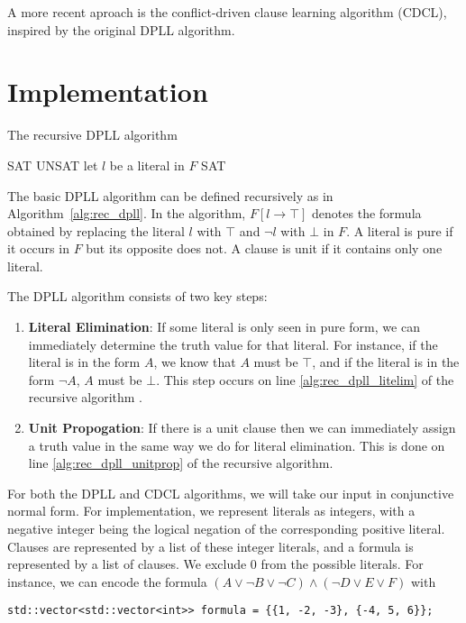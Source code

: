 \documentclass[10pt,AMS Euler]{article}
\begin{document}
A more recent aproach is the conflict-driven clause learning algorithm (CDCL), inspired by the original DPLL
algorithm. 

\section*{Implementation}
\label{sec:orgd4ad5e0}
\begin{algorithm}
\caption{The recursive DPLL algorithm}
\label{alg:rec_dpll}
\begin{algorithmic}[1]
  \State \Return SAT
  \State \Return UNSAT
 \label{alg:rec_dpll_litelim}
  \State \Return {}
 \label{alg:rec_dpll_unitprop}
  \State \Return {}
\Else
  \State let $l$ be a literal in $F$ \label{alg:rec_dpll_branch}
    \State \Return SAT
  \Else
    \State \Return {}
  \EndIf
\EndIf
\EndFunction
\end{algorithmic}
\end{algorithm}

The basic DPLL algorithm can be defined recursively as in Algorithm~\ref{alg:rec_dpll}.
In the algorithm, \(F[l \to \top]\) denotes the formula obtained by replacing the literal \(l\) with \(\top\) and
\(\neg l\) with \(\bot\) in \(F\). A literal is pure if it occurs in \(F\) but its opposite does not. A clause is unit
if it contains only one literal.

The DPLL algorithm consists of two key steps:
\begin{enumerate}
\item \textbf{Literal Elimination}: If some literal is only seen in pure form, we can immediately determine the
truth value for that literal. For instance, if the literal is in the form \(A\), we know that \(A\) must be
\(\top\), and if the literal is in the form \(\neg A\), \(A\) must be \(\bot\). This step occurs on line
\ref{alg:rec_dpll_litelim} of the recursive algorithm .
\item \textbf{Unit Propogation}: If there is a unit clause then we can immediately assign a truth value in the same
way we do for literal elimination. This is done on line \ref{alg:rec_dpll_unitprop} of the recursive
algorithm.
\end{enumerate}

For both the DPLL and CDCL algorithms, we will take our input in conjunctive normal form. For implementation,
we represent literals as integers, with a negative integer being the logical negation of the corresponding
positive literal. Clauses are represented by a list of these integer literals, and a formula is represented
by a list of clauses. We exclude 0 from the possible literals.
For instance, we can encode the formula \((A \lor \neg B \lor \neg C) \land (\neg D \lor E \lor F)\) with
\begin{verbatim}
std::vector<std::vector<int>> formula = {{1, -2, -3}, {-4, 5, 6}};
\end{verbatim}
\end{document}
